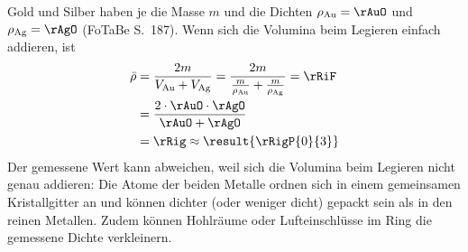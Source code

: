 Gold und Silber haben je die Masse $m$ und die Dichten $\rho_\text{Au} = \rAuO$ und $\rho_\text{Ag} = \rAgO$ (FoTaBe S.~187). Wenn sich die Volumina beim Legieren einfach addieren, ist
\begin{align}
 \bar\rho &= \frac{2m}{V_\text{Au}+V_\text{Ag}} = \frac{2m}{\frac{m}{\rho_\text{Au}}+\frac{m}{\rho_\text{Ag}}} = \rRiF \\
   &= \frac{2\cdot\rAuO\cdot\rAgO}{\rAuO+\rAgO} \\
   &= \rRig \approx \result{\rRigP{0}{3}}
\end{align}
Der gemessene Wert kann abweichen, weil sich die Volumina beim Legieren nicht genau addieren: Die Atome der beiden Metalle ordnen sich in einem gemeinsamen Kristallgitter an und können dichter (oder weniger dicht) gepackt sein als in den reinen Metallen. Zudem können Hohlräume oder Lufteinschlüsse im Ring die gemessene Dichte verkleinern.
